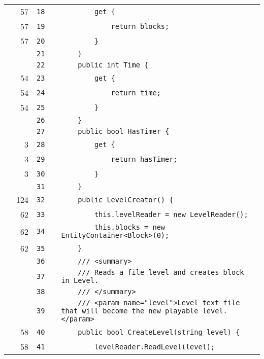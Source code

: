 \documentclass[a4paper,landscape,10pt]{article}
\begin{document}
\begin{longtable}[l]{lrrll}
\cellcolor{green} & 57 & \verb~18~ & & \verb~        get {~\\
\cellcolor{green} & 57 & \verb~19~ & & \verb~            return blocks;~\\
\cellcolor{green} & 57 & \verb~20~ & & \verb~        }~\\
\cellcolor{gray} &  & \verb~21~ & & \verb~    }~\\
\cellcolor{gray} &  & \verb~22~ & & \verb~    public int Time {~\\
\cellcolor{green} & 54 & \verb~23~ & & \verb~        get {~\\
\cellcolor{green} & 54 & \verb~24~ & & \verb~            return time;~\\
\cellcolor{green} & 54 & \verb~25~ & & \verb~        }~\\
\cellcolor{gray} &  & \verb~26~ & & \verb~    }~\\
\cellcolor{gray} &  & \verb~27~ & & \verb~    public bool HasTimer {~\\
\cellcolor{green} & 3 & \verb~28~ & & \verb~        get {~\\
\cellcolor{green} & 3 & \verb~29~ & & \verb~            return hasTimer;~\\
\cellcolor{green} & 3 & \verb~30~ & & \verb~        }~\\
\cellcolor{gray} &  & \verb~31~ & & \verb~    }~\\
\cellcolor{green} & 124 & \verb~32~ & & \verb~    public LevelCreator() {~\\
\cellcolor{green} & 62 & \verb~33~ & & \verb~        this.levelReader = new LevelReader();~\\
\cellcolor{green} & 62 & \verb~34~ & & \verb~        this.blocks = new EntityContainer<Block>(0);~\\
\cellcolor{green} & 62 & \verb~35~ & & \verb~    }~\\
\cellcolor{gray} &  & \verb~36~ & & \verb~    /// <summary>~\\
\cellcolor{gray} &  & \verb~37~ & & \verb~    /// Reads a file level and creates block in Level.~\\
\cellcolor{gray} &  & \verb~38~ & & \verb~    /// </summary>~\\
\cellcolor{gray} &  & \verb~39~ & & \verb~    /// <param name="level">Level text file that will become the new playable level.</param>~\\
\cellcolor{green} & 58 & \verb~40~ & & \verb~    public bool CreateLevel(string level) {~\\
\cellcolor{green} & 58 & \verb~41~ & & \verb~        levelReader.ReadLevel(level);~\\

\end{longtable}
\end{document}
